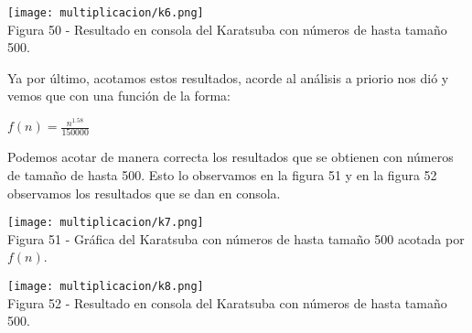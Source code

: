 \documentclass[12pt,twoside]{article}
\begin{document}
\begin{center}
    \texttt{[image: multiplicacion/k6.png]}\\
    Figura 50 - Resultado en consola del Karatsuba con números de hasta tamaño 500.
\end{center}
Ya por último, acotamos estos resultados, acorde al análisis a priorio nos dió y vemos que con una función de la forma:
\begin{center}
    $f(n) = \frac{n^{1.58}}{150000}$
\end{center}
Podemos acotar de manera correcta los resultados que se obtienen con números de tamaño de hasta 500. Esto lo observamos en la figura 51 y en la figura 52 observamos los resultados que se dan en consola.
\begin{center}
    \texttt{[image: multiplicacion/k7.png]}\\
    Figura 51 - Gráfica del Karatsuba con números de hasta tamaño 500 acotada por $f(n)$.
\end{center}
\begin{center}
    \texttt{[image: multiplicacion/k8.png]}\\
    Figura 52 - Resultado en consola del Karatsuba con números de hasta tamaño 500.
\end{center}
\end{document}
